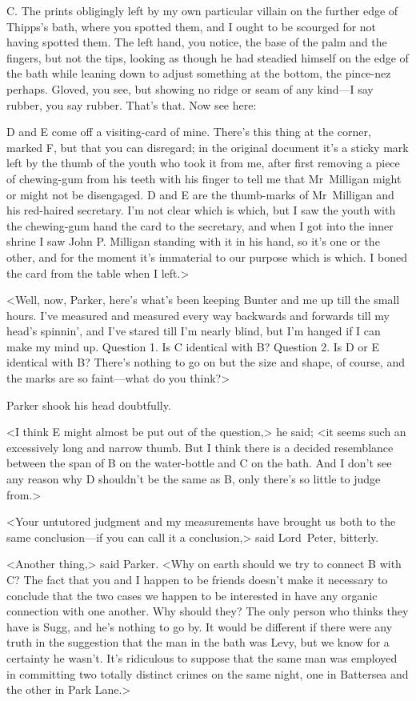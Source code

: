 \textsc{C\@.} The prints obligingly left by my own particular villain on the further edge of Thipps's bath, where you spotted them, and I ought to be scourged for not having spotted them. The left hand, you notice, the base of the palm and the fingers, but not the tips, looking as though he had steadied himself on the edge of the bath while leaning down to adjust something at the bottom, the pince-nez perhaps. Gloved, you see, but showing no ridge or seam of any kind—I say rubber, you say rubber. That's that. Now see here:

\textsc{D} and \textsc{E} come off a visiting-card of mine. There's this thing at the corner, marked F\@, but that you can disregard; in the original document it's a sticky mark left by the thumb of the youth who took it from me, after first removing a piece of chewing-gum from his teeth with his finger to tell me that Mr~Milligan might or might not be disengaged. D and E are the thumb-marks of Mr~Milligan and his red-haired secretary. I'm not clear which is which, but I saw the youth with the chewing-gum hand the card to the secretary, and when I got into the inner shrine I saw John P\@. Milligan standing with it in his hand, so it's one or the other, and for the moment it's immaterial to our purpose which is which. I boned the card from the table when I left.>

<Well, now, Parker, here's what's been keeping Bunter and me up till the small hours. I've measured and measured every way backwards and forwards till my head's spinnin', and I've stared till I'm nearly blind, but I'm hanged if I can make my mind up. Question 1. Is \textsc{C} identical with \textsc{B}? Question 2. Is \textsc{D} or \textsc{E} identical with \textsc{B}? There's nothing to go on but the size and shape, of course, and the marks are so faint—what do you think?>

Parker shook his head doubtfully.

<I think \textsc{E} might almost be put out of the question,> he said; <it seems such an excessively long and narrow thumb. But I think there is a decided resemblance between the span of \textsc{B} on the water-bottle and \textsc{C} on the bath. And I don't see any reason why \textsc{D} shouldn't be the same as \textsc{B}, only there's so little to judge from.>

<Your untutored judgment and my measurements have brought us both to the same conclusion—if you can call it a conclusion,> said Lord~Peter, bitterly.

<Another thing,> said Parker. <Why on earth should we try to connect \textsc{B} with \textsc{C}? The fact that you and I happen to be friends doesn't make it necessary to conclude that the two cases we happen to be interested in have any organic connection with one another. Why should they? The only person who thinks they have is Sugg, and he's nothing to go by. It would be different if there were any truth in the suggestion that the man in the bath was Levy, but we know for a certainty he wasn't. It's ridiculous to suppose that the same man was employed in committing two totally distinct crimes on the same night, one in Battersea and the other in Park Lane.>


